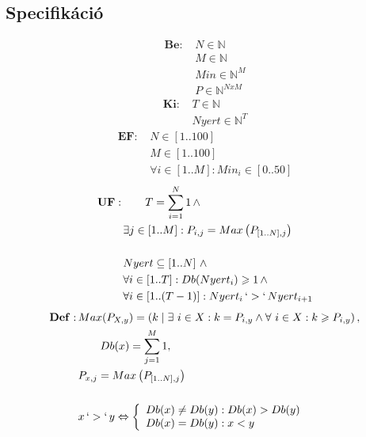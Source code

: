 \documentclass[a4paper]{article}
\begin{document}
    \subsection{Specifikáció}
    \begin{align*}
      \mathbf{Be:}\, &N \in \mathbb{N} \\
      &M \in \mathbb{N} \\
      &Min \in \mathbb{N}^M \\
      &P \in \mathbb{N}^{NxM}
    \end{align*}
    \begin{align*}
      \mathbf{Ki:}\, &T \in \mathbb{N} \\
      &Nyert \in \mathbb{N}^T
    \end{align*}
    \begin{align*}
      \mathbf{EF:}\, &N \in \left [ 1 .. 100 \right ] \\
      &M \in \left [ 1 .. 100 \right ] \\
      &\forall i \in \left [ 1 .. M \right ] : Min_i \in \left [ 0 .. 50 \right ]
    \end{align*}
    \begin{align*}
      \mathbf{UF:}\, &\qquad T=\sum_{i=1}^{N}1 \, \wedge \\
      &\exists j \in \left [ 1 .. M \right ] : P_{i,j}=Max \left ( P_{\left [ 1 .. N \right ], j} \right ) \\
      \\
      &Nyert \subseteq \left [ 1 .. N \right ] \, \wedge \\
      &\forall i \in \left [ 1 .. T \right ] : Db(Nyert_i) \geqslant 1 \, \wedge \\
      &\forall i \in \left[ 1 .. (T-1) \right ] : Nyert_i \, `>` \, Nyert_{i+1}
    \end{align*}
    \begin{align*}
      \mathbf{Def:}\, &Max(P_{X,y})=\left (k\mid \exists \ i\in X: k= P_{i,y} \wedge \forall \ i \in X: k \geqslant P_{i,y} \right ) , \\
      &\qquad Db(x)=\sum_{j=1}^{M}1 ,  \\
      &P_{x,j}=Max\left(P_{\left [ 1..N \right ],j}\right) \\
      \\
      &x \, `>` \, y \Leftrightarrow \left\{
                \begin{array}{ll}
                  Db(x) \neq Db(y) : Db(x) > Db(y)\\
                  Db(x) = Db(y) : x < y\\
                \end{array}
              \right.
    \end{align*}
\end{document}
